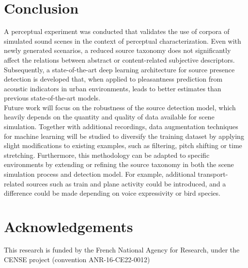 \documentclass[11pt,a4paper]{article}
\begin{document}
\section{Conclusion}
\label{sec:conclusion}

A perceptual experiment was conducted that validates the use of corpora of simulated sound scenes in the context of perceptual characterization. Even with newly generated scenarios, a reduced source taxonomy does not significantly affect the relations between abstract or content-related subjective descriptors.\\

Subsequently, a state-of-the-art deep learning architecture for source presence detection is developed that, when applied to pleasantness prediction from acoustic indicators in urban environments, leads to better estimates than previous state-of-the-art models.\\

Future work will focus on the robustness of the source detection model, which heavily depends on the quantity and quality of data available for scene simulation. Together with additional recordings, data augmentation techniques for machine learning will be studied to diversify the training dataset by applying slight modifications to existing examples, such as filtering, pitch shifting or time stretching. Furthermore, this methodology can be adapted to specific environments by extending or refining the source taxonomy in both the scene simulation process and detection model. For example, additional transport-related sources such as train and plane activity could be introduced, and a difference could be made depending on voice expressivity or bird species.

\section*{Acknowledgements}
\label{sec:ack}

This research is funded by the French National Agency for Research, under the CENSE project (convention ANR-16-CE22-0012)




\end{document}
